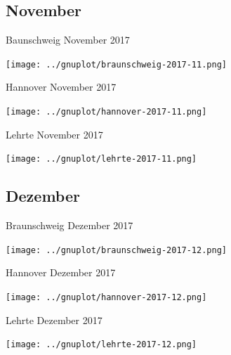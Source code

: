 \documentclass[aspectratio=169]{beamer} %
\begin{document}
\subsection{November}
\begin{frame}{Baunschweig November 2017}
  \begin{center}
    \texttt{[image: ../gnuplot/braunschweig-2017-11.png]}
  \end{center}
\end{frame}
\begin{frame}{Hannover \hspace{4cm} November 2017}
  \begin{center}
    \texttt{[image: ../gnuplot/hannover-2017-11.png]}
  \end{center}
\end{frame}
\begin{frame}{Lehrte \hspace{2cm} November 2017}
  \begin{center}
    \texttt{[image: ../gnuplot/lehrte-2017-11.png]}
  \end{center}
\end{frame}

\subsection{Dezember}
\begin{frame}{Braunschweig Dezember 2017}
  \begin{center}
    \texttt{[image: ../gnuplot/braunschweig-2017-12.png]}
  \end{center}
\end{frame}
\begin{frame}{Hannover \hspace{4cm} Dezember 2017}
  \begin{center}
    \texttt{[image: ../gnuplot/hannover-2017-12.png]}
  \end{center}
\end{frame}
\begin{frame}{Lehrte \hspace{2cm} Dezember 2017}
  \begin{center}
    \texttt{[image: ../gnuplot/lehrte-2017-12.png]}
  \end{center}
\end{frame}
\end{document}
